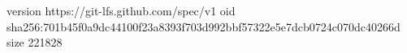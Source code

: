 version https://git-lfs.github.com/spec/v1
oid sha256:701b45f0a9dc44100f23a8393f703d992bbf57322e5e7dcb0724c070dc40266d
size 221828
